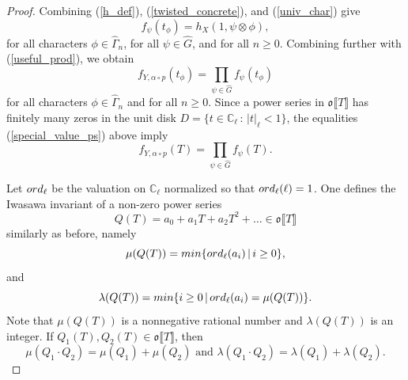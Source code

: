 \documentclass[11pt]{amsart}
\numberwithin{equation}{section}
\theoremstyle{remark}
\begin{document}
\begin{proof}
Combining (\ref{h_def}), (\ref{twisted_concrete}), and (\ref{univ_char}) give
\begin{equation} \label{special_value_ps}
f_{\psi}(t_{\phi}) = h_{X}(1,\psi \otimes \phi),
\end{equation}
for all characters $\phi \in \widehat{\Gamma}_{n}$, for all $\psi \in \widehat{G}$, and for all $n \ge 0$.  Combining further with (\ref{useful_prod}), we obtain
$$f_{Y,\alpha \circ p}(t_{\phi}) = \prod_{\psi \in \widehat{G}} f_{\psi}(t_{\phi}) $$
for all characters $\phi \in \widehat{\Gamma}_{n}$ and for all $n \ge 0$.  Since a power series in $\mathfrak{o}\llbracket T \rrbracket $ has finitely many zeros in the unit disk $D = \{t \in \mathbb{C}_{\ell} \, : \, |t|_{\ell}< 1\}$, the equalities (\ref{special_value_ps}) above imply
\begin{equation} \label{essential_eq}
f_{Y,\alpha \circ p}(T) = \prod_{\psi \in \widehat{G}}f_{\psi}(T).
\end{equation}

Let ${\rm ord}_{\ell}$ be the valuation on $\mathbb{C}_{\ell}$ normalized so that ${\rm ord}_{\ell}(\ell)=1$.  One defines the Iwasawa invariant of a non-zero power series
$$Q(T) = a_{0} + a_{1}T + a_{2}T^{2} + \ldots \in \mathfrak{o}\llbracket T \rrbracket $$
similarly as before, namely
$$\mu(Q(T)) = {\rm min}\{{\rm ord}_{\ell}(a_{i}) \, | \, i \ge 0\},$$
and
$$\lambda(Q(T)) = {\rm min}\{i \ge 0 \, | \, {\rm ord}_{\ell}(a_{i}) = \mu(Q(T))\}.$$
Note that $\mu(Q(T))$ is a nonnegative rational number and $\lambda(Q(T))$ is an integer.  If $Q_{1}(T), Q_{2}(T) \in \mathfrak{o}\llbracket T \rrbracket$, then
\begin{equation}\label{mul_inv}
\mu(Q_{1} \cdot Q_{2}) = \mu(Q_{1}) + \mu(Q_{2}) \text{ and } \lambda(Q_{1} \cdot Q_{2}) = \lambda(Q_{1}) + \lambda(Q_{2}).
\end{equation}


\end{proof}
\end{document}
